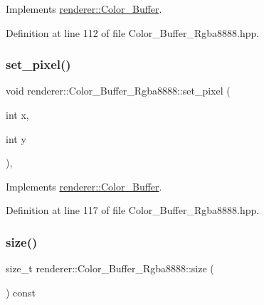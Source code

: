Implements \mbox{\hyperlink{classrenderer_1_1_color___buffer_a02e8a2b93f5d95f10e2aedd24ee02625}{renderer\+::\+Color\+\_\+\+Buffer}}.



Definition at line 112 of file Color\+\_\+\+Buffer\+\_\+\+Rgba8888.\+hpp.

\mbox{\label{classrenderer_1_1_color___buffer___rgba8888_aaebcb0ce419750f0673fc9d3c59b929d}} 
\subsubsection{\texorpdfstring{set\_pixel()}{set\_pixel()}\hspace{0.1cm}{\footnotesize\ttfamily [2/2]}}
{\footnotesize\ttfamily void renderer\+::\+Color\+\_\+\+Buffer\+\_\+\+Rgba8888\+::set\+\_\+pixel (\begin{DoxyParamCaption}\item[{int}]{x,  }\item[{int}]{y }\end{DoxyParamCaption})\hspace{0.3cm}{\ttfamily [inline]}, {\ttfamily [virtual]}}



Implements \mbox{\hyperlink{classrenderer_1_1_color___buffer_a383c851cb75200d8924857b1b28a675e}{renderer\+::\+Color\+\_\+\+Buffer}}.



Definition at line 117 of file Color\+\_\+\+Buffer\+\_\+\+Rgba8888.\+hpp.

\mbox{\label{classrenderer_1_1_color___buffer___rgba8888_a76fda60ebe39b53c7cda3b3ee04a525a}} 
\subsubsection{\texorpdfstring{size()}{size()}}
{\footnotesize\ttfamily size\+\_\+t renderer\+::\+Color\+\_\+\+Buffer\+\_\+\+Rgba8888\+::size (\begin{DoxyParamCaption}{ }\end{DoxyParamCaption}) const\hspace{0.3cm}{\ttfamily [inline]}}



